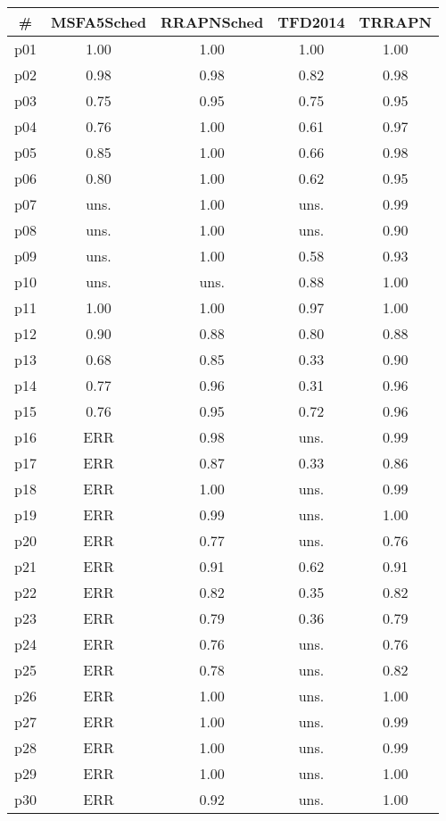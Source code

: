 \begin{tabular}{ccccc}
\toprule
\textbf{\#} & \textbf{MSFA5Sched} & \textbf{RRAPNSched} & \textbf{TFD2014} & \textbf{TRRAPN}\\
\midrule
p01 & 1.00 & 1.00 & 1.00 & 1.00\\
p02 & 0.98 & 0.98 & 0.82 & 0.98\\
p03 & 0.75 & 0.95 & 0.75 & 0.95\\
p04 & 0.76 & 1.00 & 0.61 & 0.97\\
p05 & 0.85 & 1.00 & 0.66 & 0.98\\
p06 & 0.80 & 1.00 & 0.62 & 0.95\\
p07 & uns. & 1.00 & uns. & 0.99\\
p08 & uns. & 1.00 & uns. & 0.90\\
p09 & uns. & 1.00 & 0.58 & 0.93\\
p10 & uns. & uns. & 0.88 & 1.00\\
p11 & 1.00 & 1.00 & 0.97 & 1.00\\
p12 & 0.90 & 0.88 & 0.80 & 0.88\\
p13 & 0.68 & 0.85 & 0.33 & 0.90\\
p14 & 0.77 & 0.96 & 0.31 & 0.96\\
p15 & 0.76 & 0.95 & 0.72 & 0.96\\
p16 & ERR & 0.98 & uns. & 0.99\\
p17 & ERR & 0.87 & 0.33 & 0.86\\
p18 & ERR & 1.00 & uns. & 0.99\\
p19 & ERR & 0.99 & uns. & 1.00\\
p20 & ERR & 0.77 & uns. & 0.76\\
p21 & ERR & 0.91 & 0.62 & 0.91\\
p22 & ERR & 0.82 & 0.35 & 0.82\\
p23 & ERR & 0.79 & 0.36 & 0.79\\
p24 & ERR & 0.76 & uns. & 0.76\\
p25 & ERR & 0.78 & uns. & 0.82\\
p26 & ERR & 1.00 & uns. & 1.00\\
p27 & ERR & 1.00 & uns. & 0.99\\
p28 & ERR & 1.00 & uns. & 0.99\\
p29 & ERR & 1.00 & uns. & 1.00\\
p30 & ERR & 0.92 & uns. & 1.00\\
\bottomrule
\end{tabular}

